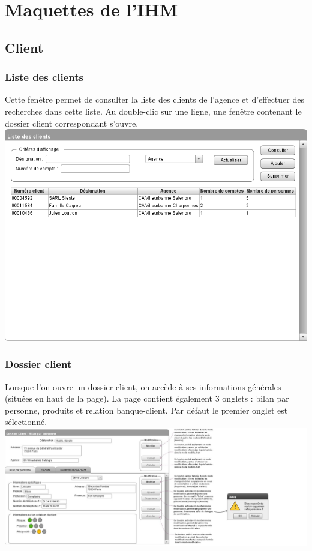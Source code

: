 \section{Maquettes de l'IHM} 

	\subsection{Client}
	
		\subsubsection{Liste des clients}
		Cette fenêtre permet de consulter la liste des clients de l'agence et d'effectuer des recherches dans cette liste. Au double-clic sur une ligne, une fenêtre contenant le dossier client correspondant s'ouvre. \\
		\includegraphics[width=\linewidth]{IHM/Liste_Clients.png}
		
		\newpage		
		
		\subsubsection{Dossier client}
		Lorsque l'on ouvre un dossier client, on accède à ses informations générales (situées en haut de la page). La page contient également 3 onglets : bilan par personne, produits et relation banque-client. Par défaut le premier onglet est sélectionné. \\
		\includegraphics[scale=0.45, angle=90]{IHM/IHMclient1.jpg}
		
